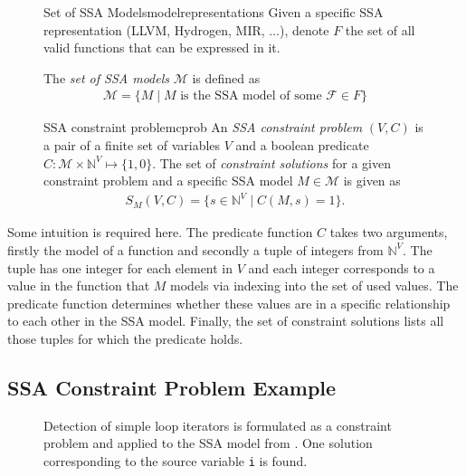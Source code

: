 \begin{figure}[H]
\begin{definition}{Set of SSA Models}{modelrepresentations}
    Given a specific SSA representation (LLVM, Hydrogen, MIR, $\dots$),
    denote $F$ the set of all valid functions that can be expressed in it.

    The {\em set of SSA models} $\mathcal M$ is defined as
    \begin{align*}
        \mathcal M=\{M\mid M \text{ is the SSA model of some }\mathcal F\in F\}
    \end{align*}
\end{definition}

\begin{definition}{SSA constraint problem}{cprob}
    An {\it SSA constraint problem} $(V,C)$ is a pair of a finite set of
    variables $V$ and a boolean predicate
    $C\colon\mathcal M\times\mathbb N^V\mapsto\{1,0\}$.
    The set of {\em constraint solutions} for a given constraint problem and a
    specific SSA model $M\in\mathcal M$ is given as
    \begin{align*}
        S_M(V,C) = \{s\in\mathbb N^V\mid C(M,s)=1\}.
    \end{align*}
\end{definition}
\end{figure}

    Some intuition is required here.
    The predicate function $C$ takes two arguments, firstly the model of a
    function and secondly a tuple of integers from $\mathbb N^V$.
    The tuple has one integer for each element in $V$ and each integer
    corresponds to a value in the function that $M$ models via indexing
    into the set of used values.
    The predicate function determines whether these values are in a specific
    relationship to each other in the SSA model.
    Finally, the set of constraint solutions lists all those tuples for which
    the predicate holds.

\subsection{SSA Constraint Problem Example}

\begin{figure}[p]
    
\caption{Detection of simple loop iterators is formulated as a constraint
         problem and applied to the SSA model from .
         One solution corresponding to the source variable {\tt i} is found.}
\label{fig:constraintsolution}
\end{figure}

